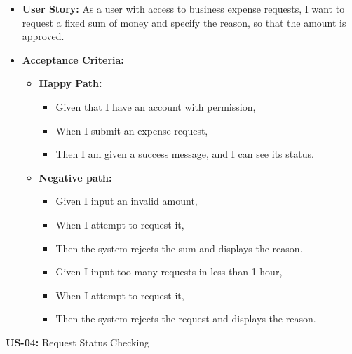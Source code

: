 \documentclass[11pt,a4paper]{article}
\begin{document}
\begin{itemize}
\item
  \textbf{User Story:} As a user with access to business expense
  requests, I want to request a fixed sum of money and specify the reason, so that the amount
  is approved.
\item
  \textbf{Acceptance Criteria:}

  \begin{itemize}
  \item
    \textbf{Happy Path:}

    \begin{itemize}
    \item
      Given that I have an account with permission,
    \item
      When I submit an expense request,
    \item
      Then I am given a success message, and I can see its status.
    \end{itemize}
  \item
    \textbf{Negative path:}

    \begin{itemize}
    \item
      Given I input an invalid amount,
    \item
      When I attempt to request it,
    \item
      Then the system rejects the sum and displays the reason.
    \item
      Given I input too many requests in less than 1 hour,
    \item
      When I attempt to request it,
    \item
      Then the system rejects the request and displays the reason.
    \end{itemize}
  \end{itemize}
\end{itemize}
\textbf{US-04:} Request Status Checking
\end{document}
